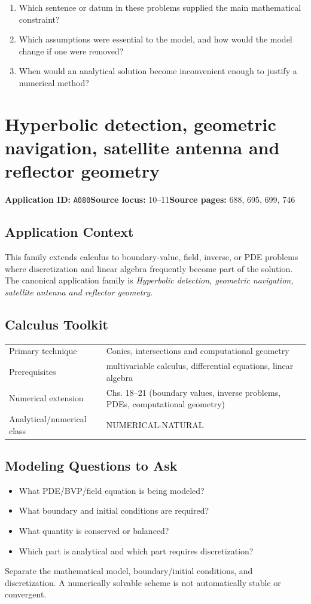 \documentclass[11pt]{book}
\newcommand{\pid}[1]{\texttt{#1}}
\begin{document}
\begin{reflectionbox}\begin{enumerate}
\item Which sentence or datum in these problems supplied the main mathematical constraint?
\item Which assumptions were essential to the model, and how would the model change if one were removed?
\item When would an analytical solution become inconvenient enough to justify a numerical method?
\end{enumerate}\end{reflectionbox}
\chapter{Hyperbolic detection, geometric navigation, satellite antenna and reflector geometry}\label{app:A080}
\textbf{Application ID:} \pid{A080}\quad \textbf{Source locus:} 10–11\quad \textbf{Source pages:} 688, 695, 699, 746
\section*{Application Context}
This family extends calculus to boundary-value, field, inverse, or PDE problems where discretization and linear algebra frequently become part of the solution. The canonical application family is \emph{Hyperbolic detection, geometric navigation, satellite antenna and reflector geometry}.
\section*{Calculus Toolkit}
\begin{tabularx}{\textwidth}{@{}lX@{}}\toprule
Primary technique & Conics, intersections and computational geometry \\
Prerequisites & multivariable calculus, differential equations, linear algebra \\
Numerical extension & Chs. 18–21 (boundary values, inverse problems, PDEs, computational geometry) \\
Analytical/numerical class & NUMERICAL-NATURAL \\
\bottomrule\end{tabularx}
\section*{Modeling Questions to Ask}\begin{itemize}
\item What PDE/BVP/field equation is being modeled?
\item What boundary and initial conditions are required?
\item What quantity is conserved or balanced?
\item Which part is analytical and which part requires discretization?
\end{itemize}
\begin{errorbox}Separate the mathematical model, boundary/initial conditions, and discretization. A numerically solvable scheme is not automatically stable or convergent.\end{errorbox}
\end{document}
